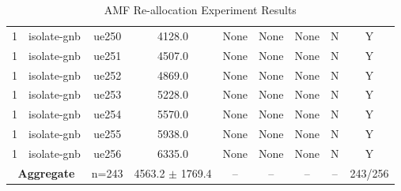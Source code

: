 \begin{table}[ht]
\begin{tabular}{|c|c|c|c|c|c|c|c|c|}
1 & isolate-gnb & ue250 & 4128.0 & None & None & None & N & Y \\
1 & isolate-gnb & ue251 & 4507.0 & None & None & None & N & Y \\
1 & isolate-gnb & ue252 & 4869.0 & None & None & None & N & Y \\
1 & isolate-gnb & ue253 & 5228.0 & None & None & None & N & Y \\
1 & isolate-gnb & ue254 & 5570.0 & None & None & None & N & Y \\
1 & isolate-gnb & ue255 & 5938.0 & None & None & None & N & Y \\
1 & isolate-gnb & ue256 & 6335.0 & None & None & None & N & Y \\
\multicolumn{2}{|c|}{\textbf{Aggregate}} & n=243 & 4563.2 $\pm$ 1769.4 & -- & -- & -- & -- & 243/256 \\
\hline
\end{tabular}
\caption{AMF Re-allocation Experiment Results}
\label{tab:amf_realloc}
\end{table}
